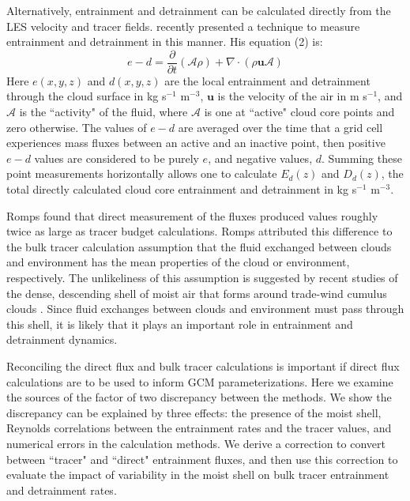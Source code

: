 \documentclass[draft,grl]{agutex}
\begin{document}
\begin{article}
Alternatively, entrainment and detrainment can be calculated directly from the 
LES velocity and tracer fields.  \cite{Romps2010} recently presented a 
technique to measure entrainment and detrainment in this manner.  His equation (2) is:
\begin{equation}
  \label{eq:romps_e_minus_d}
  e - d = \frac{\partial}{\partial t}(\mathcal{A}\rho) 
        + \nabla \cdot (\rho \mathbf{u} \mathcal{A}) 
\end{equation}
Here $e(x,y,z)$ and $d(x,y,z)$ are the local entrainment and detrainment through 
the cloud surface in kg s$^{-1}$ m$^{-3}$, $\mathbf{u}$ is the velocity of the 
air in m s$^{-1}$, and $\mathcal{A}$ is the ``activity" of the fluid, where 
$\mathcal{A}$ is one at ``active" cloud core points and zero otherwise.  The 
values of $e - d$ are averaged over the time that a grid cell experiences mass 
fluxes between an active and an inactive point, then positive $e-d$ values 
are considered to be purely $e$, and negative values, $d$.  Summing these point 
measurements horizontally allows one to calculate  $E_d(z)$ and $D_d(z)$, the 
total directly calculated cloud core entrainment and detrainment in kg s$^{-1}$ 
m$^{-3}$.

Romps found that direct measurement of the fluxes produced values roughly twice 
as large as tracer budget calculations.  Romps attributed this difference to 
the bulk tracer calculation assumption that the fluid exchanged between clouds 
and environment has the mean properties of the cloud or environment, 
respectively.  The unlikeliness of this assumption is suggested by recent 
studies of the dense, descending shell of moist air that forms around 
trade-wind cumulus clouds \citep{Heus2008, Wang2010}.  Since fluid exchanges 
between clouds and environment must pass through this shell, it is likely that 
it plays an important role in entrainment and detrainment dynamics.

Reconciling the direct flux and bulk tracer calculations is important if direct 
flux calculations are to be used to inform GCM parameterizations.  Here we 
examine the sources of the factor of two discrepancy between the methods.  We 
show the discrepancy can be explained by three effects: the presence of the 
moist shell, Reynolds correlations between the entrainment rates and the tracer 
values, and numerical errors in the calculation methods.  We derive a 
correction to convert between ``tracer" and ``direct" entrainment fluxes, and 
then use this correction to evaluate the impact of variability in the moist 
shell on bulk tracer entrainment and detrainment rates.


\end{article}
\end{document}

